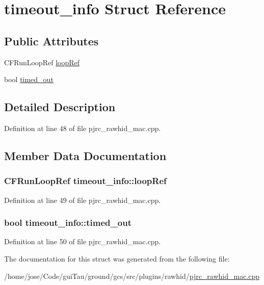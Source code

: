 \hypertarget{structtimeout__info}{\section{timeout\-\_\-info Struct Reference}
\label{structtimeout__info}
}
\subsection*{Public Attributes}
\begin{DoxyCompactItemize}
\item 
C\-F\-Run\-Loop\-Ref \hyperlink{structtimeout__info_a690f0ac4bca1156238d6f690e64c9f45}{loop\-Ref}
\item 
bool \hyperlink{structtimeout__info_a724828dccca04c73d6af31e92a6b4eda}{timed\-\_\-out}
\end{DoxyCompactItemize}


\subsection{Detailed Description}


Definition at line 48 of file pjrc\-\_\-rawhid\-\_\-mac.\-cpp.



\subsection{Member Data Documentation}
\hypertarget{structtimeout__info_a690f0ac4bca1156238d6f690e64c9f45}{
\subsubsection[{loop\-Ref}]{\setlength{\rightskip}{0pt plus 5cm}C\-F\-Run\-Loop\-Ref timeout\-\_\-info\-::loop\-Ref}}\label{structtimeout__info_a690f0ac4bca1156238d6f690e64c9f45}


Definition at line 49 of file pjrc\-\_\-rawhid\-\_\-mac.\-cpp.

\hypertarget{structtimeout__info_a724828dccca04c73d6af31e92a6b4eda}{
\subsubsection[{timed\-\_\-out}]{\setlength{\rightskip}{0pt plus 5cm}bool timeout\-\_\-info\-::timed\-\_\-out}}\label{structtimeout__info_a724828dccca04c73d6af31e92a6b4eda}


Definition at line 50 of file pjrc\-\_\-rawhid\-\_\-mac.\-cpp.



The documentation for this struct was generated from the following file\-:\begin{DoxyCompactItemize}
\item 
/home/jose/\-Code/gui\-Tau/ground/gcs/src/plugins/rawhid/\hyperlink{pjrc__rawhid__mac_8cpp}{pjrc\-\_\-rawhid\-\_\-mac.\-cpp}\end{DoxyCompactItemize}
